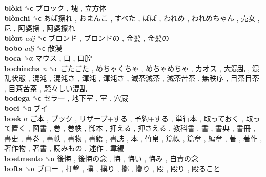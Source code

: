 \textbf{blòki} ␝ϲ   ブロック ,  塊 ,  立方体   \\
\textbf{blònchi} ␝ϲ   あば擦れ ,  おまんこ ,  すべた ,  ぼぼ ,  われめ ,  われめちゃん ,  売女 ,  尼 ,  阿婆擦 ,  阿婆擦れ   \\
\textbf{blònt} \emph{adj}  ␝ϲ   ブロンド ,  ブロンドの ,  金髪 ,  金髪の   \\
\textbf{bobo} \emph{adj}  ␝ϲ   散漫   \\
\textbf{boca} ␝α   マウス ,  口 ,  口腔   \\
\textbf{bochincha} \emph{n}  ␝ϲ   ごたごた ,  めちゃくちゃ ,  めちゃめちゃ ,  カオス ,  大混乱 ,  混乱状態 ,  混沌 ,  混沌さ ,  渾沌 ,  渾沌さ ,  滅茶滅茶 ,  滅茶苦茶 ,  無秩序 ,  目茶目茶 ,  目茶苦茶 ,  騒々しい混乱   \\
\textbf{bodega} ␝ϲ   セラー ,  地下室 ,  室 ,  穴蔵   \\
\textbf{boei} ␝α   ブイ   \\
\textbf{boek} α   ご本 ,  ブック ,  リザーブ+する ,  予約+する ,  単行本 ,  取っておく ,  取って置く ,  図書 ,  巻 ,  巻帙 ,  御本 ,  押える ,  押さえる ,  教科書 ,  書 ,  書典 ,  書冊 ,  書史 ,  書巻 ,  書帙 ,  書物 ,  書籍 ,  書誌 ,  本 ,  竹帛 ,  篇帙 ,  篇章 ,  編章 ,  著 ,  著作 ,  著作物 ,  著書 ,  読みもの ,  述作 ,  韋編   \\
\textbf{boetmento} ␝α   後悔 ,  後悔の念 ,  悔 ,  悔い ,  悔み ,  自責の念   \\
\textbf{bofta} ␝α   ブロー ,  打撃 ,  撲 ,  撲り ,  擲 ,  擲り ,  殴 ,  殴り ,  殴ること   \\
